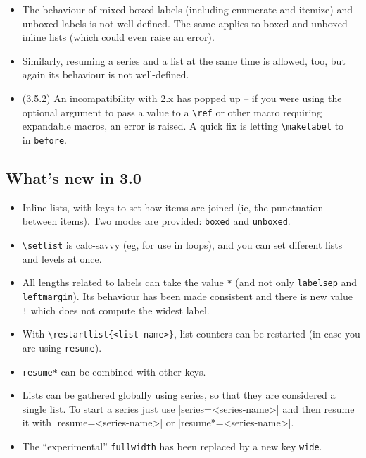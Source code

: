 \documentclass[a4paper]{ltxguide}
\newcommand\3{\unskip\enspace\fbox{\fontsize{4}{4}\selectfont NEW 3.0}}
\begin{document}
\begin{enumerate}[leftmargin=*]
\begin{enumerate}[leftmargin=\parindent]
\begin{enumerate}[labelindent=\parindent,|\allowbreak
| leftmargin=*,|\allowbreak| label=\Roman*.,|\allowbreak
| widest=IV,|\allowbreak| align=left]
\begin{enumerate}[label=\fbox{\arabic*}]
\begin{itemize}
\item The behaviour of mixed boxed labels (including enumerate and
itemize) and unboxed labels is not well-defined.  The same applies to
boxed and unboxed inline lists (which could even raise an error).

\item
Similarly, resuming a series and a list at the same time is allowed,
too, but again its behaviour is not well-defined.

\item (3.5.2) An incompatibility with 2.x has popped up -- if you were
using the optional argument to pass a value to a \verb|\ref| or other 
macro requiring expandable macros, an error is raised. A quick fix 
is letting \verb|\makelabel| to |\descriptionlabel| in \texttt{before}.

\end{itemize}

\subsection{What's new in 3.0}

\begin{itemize}
\item Inline lists, with keys to set how items are joined (ie, the
punctuation between items).  Two modes are provided: \verb|boxed|  and
\verb|unboxed|.

\item \verb|\setlist| is \textsf{calc}-savvy (eg, for use in loops),
and you can set diferent lists and levels at once.  \item All lengths
related to labels can take the value \verb|*| (and not only
\verb|labelsep| and \verb|leftmargin|).  Its behaviour has been made
consistent and there is new value \verb|!| which does not compute the
widest label.

\item With \verb|\restartlist{<list-name>}|, list counters can be restarted (in
case you are using \verb|resume|).

\item \verb|resume*| can be combined with other keys.

\item Lists can be gathered globally using series, so that they are
considered a single list.  To start a series just use
|series=<series-name>| and then resume it with |resume=<series-name>| or
|resume*=<series-name>|.

\item The ``experimental'' \verb|fullwidth| has been replaced by a new key
\verb|wide|.


\end{itemize}
\end{enumerate}
\end{enumerate}
\end{enumerate}
\end{enumerate}
\end{document}
